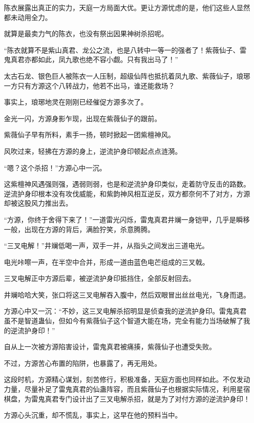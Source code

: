 
\begin{this_body}

陈衣展露出真正的实力，天庭一方局面大优。更让方源忧虑的是，他们这些人显然都未动用全力。

就算是最卖力气的陈衣，也没有祭出因果神树杀招呢。

“陈衣就算不是紫山真君、龙公之流，也是八转中一等一的强者了！紫薇仙子、雷鬼真君亦都如此，凤九歌也绝不容小觑。只有我出马了！”

太古石龙、银色巨人被陈衣一人压制，超级仙阵也抵抗着凤九歌、紫薇仙子，琅琊一方只有方源这个八转战力，他若不出马，谁还能救场？

事实上，琅琊地灵在刚刚已经催促方源多次了。

金光一闪，方源身影乍现，出现在紫薇仙子的跟前。

紫薇仙子早有所料，素手一扬，顿时掀起一团紫檀神风。

风吹过来，轻拂在方源的身上，逆流护身印顿起点点涟漪。

“嗯？这个杀招！”方源心中一沉。

这紫檀神风遇强则强，遇弱则弱，也是和逆流护身印类似，走着防守反击的路数。逆流护身印根本没有攻伐威能，和紫韵神风相互逆反，双方都奈何不了对方，方源却被这股风力推出去。

“方源，你终于舍得下来了！”一道雷光闪烁，雷鬼真君井斓一身铠甲，几乎是瞬移一般，出现在方源的背后，满脸狞笑，杀意腾腾。

“三叉电解！”井斓低喝一声，双手一并，从指头之间发出三道电光。

电光咔嚓一声，在半空中合并，形成一道由蓝色电芒组成的三叉戟。

三叉电解正中方源后辈，被逆流护身印抵挡住，全部反射回去。

井斓哈哈大笑，张口将这三叉电解吞入腹中，然后双眼冒出丝丝电光，飞身而退。

方源心中又一沉：“不妙，这三叉电解杀招明显是侦查我的逆流护身印。雷鬼真君虽不是智道蛊仙，但如今有紫薇仙子这个智道大能在场，完全有能力当场破解了我的逆流护身印！”

自从上一次被方源陷害设计，雷鬼真君被痛揍，紫薇仙子也遭受失败。

不过，方源苦心布置的陷阱，也暴露了，再无用处。

这段时机，方源精心谋划，刻苦修行，积极准备，天庭方面也同样如此。不仅发动力量，尽量补足了雷鬼真君的仙蛊阵容，而且紫薇仙子也根据实际情况，利用星宿棋盘，为雷鬼真君专门设计出了三叉电解杀招，就是为了对付方源的逆流护身印！

方源心头沉重，却不慌乱，事实上，这早在他的预料当中。


\end{this_body}
